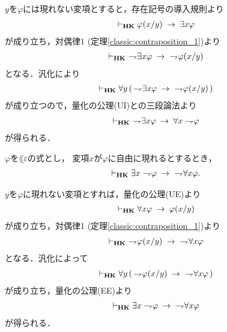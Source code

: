 	\begin{sketch}
		$y$を$\varphi$には現れない変項とすると，存在記号の導入規則より
		\begin{align}
			\vdash_{{\scriptsize \mbox{{\bf HK}}}} \varphi(x/y) \hspace{0.25em}\rightarrow\hspace{0.25em} \exists x \varphi
		\end{align}
		が成り立ち，対偶律$1$ (定理\ref{classic:contraposition_1})より
		\begin{align}
			\provable{\mbox{{\bf HK}}}\ 
			\negation \exists x \varphi \rarrow\ \negation \varphi(x/y) 
		\end{align}
		となる．汎化により
		\begin{align}
			\vdash_{{\scriptsize \mbox{{\bf HK}}}} \forall y\, (\, \rightharpoondown\hspace{-0.25em} \exists x \varphi \hspace{0.25em}\rightarrow\hspace{0.25em}\ \rightharpoondown\hspace{-0.25em} \varphi(x/y) \, ) 
		\end{align}
		が成り立つので，量化の公理(UI)との三段論法より
		\begin{align}
			\provable{\mbox{{\bf HK}}}\ 
			\negation \exists x \varphi \rarrow \forall x \negation \varphi 
		\end{align}
		が得られる．
		\QED
	\end{sketch}
	
	\begin{screen}
		\begin{thm}
		\label{classic:strong_De_Morgan_law_1}
			$\varphi$を$\lang{\varepsilon}$の式とし，
			変項$x$が$\varphi$に自由に現れるとするとき，
			\begin{align}
				\vdash_{{\scriptsize \mbox{{\bf HK}}}}
				\exists x \rightharpoondown\hspace{-0.25em} \varphi \hspace{0.25em}\rightarrow\hspace{0.25em}\ \rightharpoondown\hspace{-0.25em} \forall x \varphi.
			\end{align}
		\end{thm}
	\end{screen}
	
	\begin{sketch}
		$y$を$\varphi$に現れない変項とすれば，量化の公理(UE)より
		\begin{align}
			\vdash_{{\scriptsize \mbox{{\bf HK}}}} \forall x \varphi \hspace{0.25em}\rightarrow\hspace{0.25em} \varphi(x/y)
		\end{align}
		が成り立ち，対偶律1 (定理\ref{classic:contraposition_1})より
		\begin{align}
			\provable{\mbox{{\bf HK}}}\ \negation \varphi(x/y) \rarrow\ \negation \forall x \varphi
		\end{align}
		となる．汎化によって
		\begin{align}
			\vdash_{{\scriptsize \mbox{{\bf HK}}}} \forall y\, (\, \rightharpoondown\hspace{-0.25em} \varphi(x/y) \hspace{0.25em}\rightarrow\hspace{0.25em}\ \rightharpoondown\hspace{-0.25em} \forall x \varphi\, )
		\end{align}
		が成り立ち，量化の公理(EE)より
		\begin{align}
			\vdash_{{\scriptsize \mbox{{\bf HK}}}} \exists x \rightharpoondown\hspace{-0.25em} \varphi \hspace{0.25em}\rightarrow\hspace{0.25em}\ \rightharpoondown\hspace{-0.25em} \forall x \varphi
		\end{align}
		が得られる．
		\QED
	\end{sketch}
	
